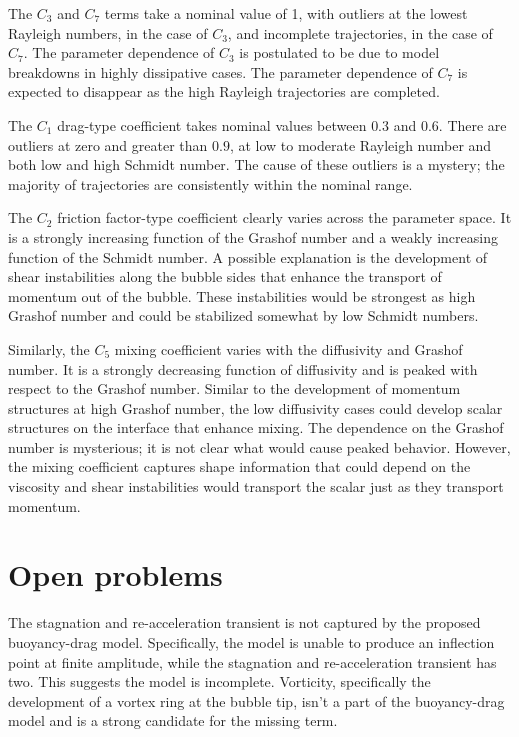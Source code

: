 The $C_3$ and $C_7$ terms take a nominal value of 1, with outliers at the lowest Rayleigh numbers, in the case of $C_3$, and incomplete trajectories, in the case of $C_7$.
The parameter dependence of $C_3$ is postulated to be due to model breakdowns in highly dissipative cases.
The parameter dependence of $C_7$ is expected to disappear as the high Rayleigh trajectories are completed.

The $C_1$ drag-type coefficient takes nominal values between $0.3$ and $0.6$.
There are outliers at zero and greater than $0.9$, at low to moderate Rayleigh number and both low and high Schmidt number.
The cause of these outliers is a mystery; the majority of trajectories are consistently within the nominal range.

The $C_2$ friction factor-type coefficient clearly varies across the parameter space.
It is a strongly increasing function of the Grashof number and a weakly increasing function of the Schmidt number.
A possible explanation is the development of shear instabilities along the bubble sides that enhance the transport of momentum out of the bubble.
These instabilities would be strongest as high Grashof number and could be stabilized somewhat by low Schmidt numbers.

Similarly, the $C_5$ mixing coefficient varies with the diffusivity and Grashof number.
It is a strongly decreasing function of diffusivity and is peaked with respect to the Grashof number.
Similar to the development of momentum structures at high Grashof number, the low diffusivity cases could develop scalar structures on the interface that enhance mixing.
The dependence on the Grashof number is mysterious; it is not clear what would cause peaked behavior.
However, the mixing coefficient captures shape information that could depend on the viscosity and shear instabilities would transport the scalar just as they transport momentum.


\section{Open problems}

The stagnation and re-acceleration transient is not captured by the proposed buoyancy-drag model.
Specifically, the model is unable to produce an inflection point at finite amplitude, while the stagnation and re-acceleration transient has two.
This suggests the model is incomplete.
Vorticity, specifically the development of a vortex ring at the bubble tip, isn't a part of the buoyancy-drag model and is a strong candidate for the missing term.

